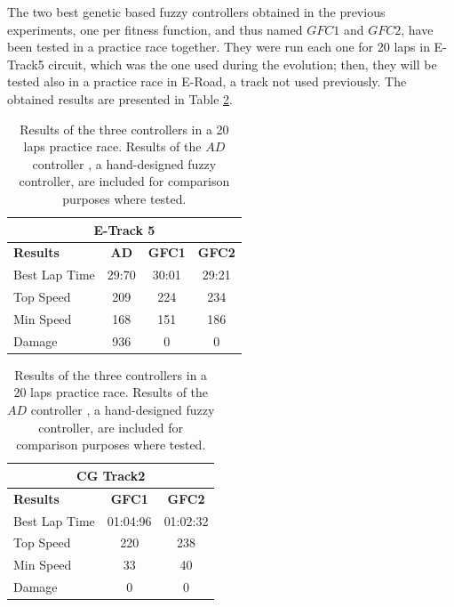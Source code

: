 \documentclass[conference]{IEEEtran}
\begin{document}
The two best genetic based fuzzy controllers obtained in the previous
experiments, one per fitness function, and thus named $GFC1$ and
$GFC2$, have been tested
in a practice race together. They were run %
each one for 20 laps in E-Track5 circuit, which was the one used during the
evolution; then, they will be tested also in a practice race in
E-Road, a track not used previously. The obtained results are presented
in Table \ref{resultat20}. 

\begin{table}[!ht]
	\centering
	{\scriptsize
		\caption{Results of the three controllers in a 20 laps
			practice race. Results of the $AD$ controller
			\cite{evo17}, a hand-designed fuzzy controller, are
			included for comparison purposes where tested.}
		\label{resultat20}
		\begin{tabular}{|p{3cm}|c|c|c|}
			\hline
			\multicolumn{4}{|c|}{\textbf{E-Track 5}}  \\
			\hline \textbf{Results} & \textbf{AD} & \textbf{GFC1} & \textbf{GFC2}\\
			\hline Best Lap Time         & 29:70 & 30:01 & 29:21 \\
			\hline Top Speed          & 209 & 224 & 234\\
			\hline Min Speed          & 168 & 151 & 186 \\
			\hline Damage          & 936 & 0 & 0\\
			\hline
		\end{tabular}
		\begin{tabular}{|p{3cm}|c|c|}
			\hline
			\multicolumn{3}{|c|}{\textbf{CG Track2}}  \\ 
			\hline \textbf{Results} & \textbf{GFC1} & \textbf{GFC2}  \\
			\hline Best Lap Time         &       01:04:96     & 01:02:32  \\
			\hline Top Speed &220  &  238 \\
			\hline Min Speed               & 33             & 40  \\
			\hline Damage                    & 0              & 0  \\
			\hline 
		\end{tabular}
	}
\end{table} %
\end{document}
